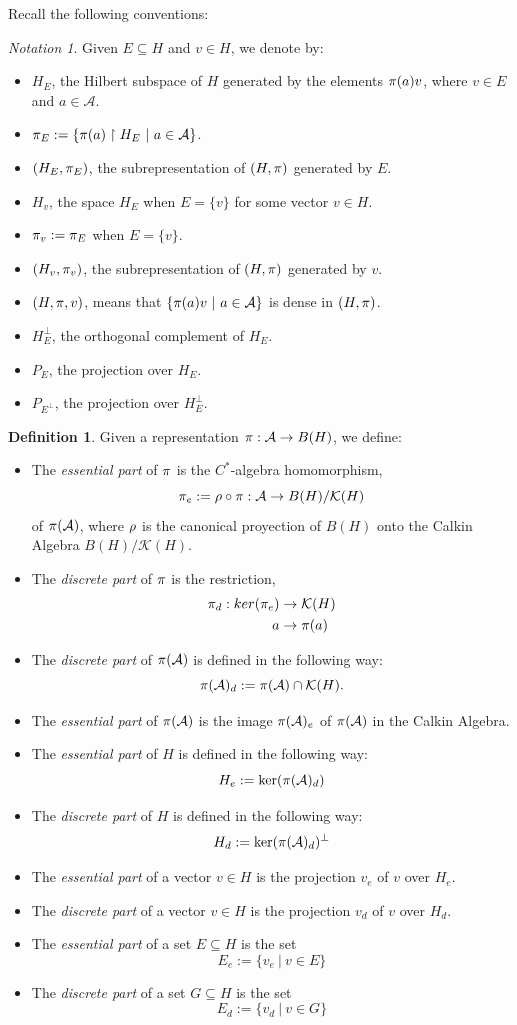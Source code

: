 \documentclass{amsart}
\def\bitm{\begin{itemize}}\def\eitm{\end{itemize}}
\def\bdf{\begin{defin}}\def\edf{\end{defin}}
\def\A{\mathcal{A}}
\theoremstyle{definition}
\newtheorem{defin}[theo]{Definition}
\theoremstyle{remark}
\newtheorem{nota}[theo]{Notation}
\begin{document}
Recall the following conventions:
\begin{nota}\label{DefinitionHv}
Given $E\subseteq H$ and $v\in H$, we denote by:
\bitm 
\item $H_E$, the Hilbert subspace of $H$ generated by the elements $\pi(a)v$, where $v\in E$ and $a\in\A$.
\item $\p_E:=\{\p(a)\upharpoonright H_E\ |\ a\in \A\}$.
\item $(H_E,\pi_E)$, the subrepresentation of $(H,\pi)$ generated by $E$.
\item $H_v$, the space $H_E$ when $E=\{v\}$ for some vector $v\in H$.
\item $\pi_v:=\pi_E$ when $E=\{v\}$.
\item $(H_v,\pi_v)$, the subrepresentation of $(H,\pi)$ generated by $v$.
\item $(H,\pi,v)$, means that $\{\p(a)v\ |\ a\in\A\}$ is dense in $(H,\pi)$.
\item $H_E^\perp$, the orthogonal complement of $H_E$.
\item $P_E$, the projection over $H_E$.
\item $P_{E^\perp}$, the projection over $H_E^\perp$.
\eitm
\ent

\bdf
Given a representation $\p:\A\to B(H)$, we define:
\bitm
\item The \textit{essential part} of $\pi$ is the $C^*$-algebra homomorphism, \[\p_e:=\r\circ\p:\A\to B(H)/\mathcal{K}(H)\] of $\p(\A)$, where $\rho$ is the canonical proyection of $B(H)$ onto the Calkin Algebra $B(H)/\mathcal{K}(H)$.
\item The \textit{discrete part} of $\pi$ is the restriction,
\begin{align*}
\pi_d:ker(\pi_e)&\to \mathcal{K}(H)\\
a &\to \pi(a)
\end{align*}
\item The \textit{discrete part} of $\p(\A)$ is defined in the following way:
\[\p(\A)_d:=\p(\A)\cap \mathcal{K}(H).\]
\item The \textit{essential part} of $\p(\A)$ is the image $\p(\A)_e$ of $\p(\A)$ in the Calkin Algebra. 
\item The \textit{essential part} of $H$ is defined in the following way:
\[H_e:=\text{ker}(\p(\A)_d)\]
\item The \textit{discrete part} of $H$ is defined in the following way:
\[H_d:=\text{ker}(\p(\A)_d)^\perp\]
\item The \textit{essential part} of a vector $v\in H$ is the projection $v_e$ of $v$ over $H_e$.
\item The \textit{discrete part} of a vector $v\in H$ is the projection $v_d$ of $v$ over $H_d$.
\item The \textit{essential part} of a set $E\subseteq H$ is the set
\[E_e:=\{v_e\ |\ v\in E\}\]
\item The \textit{discrete part} of a set $G\subseteq H$ is the set
\[E_d:=\{v_d\ |\ v\in G\}\]
\eitm
\end{defin}


\end{nota}
\end{document}
